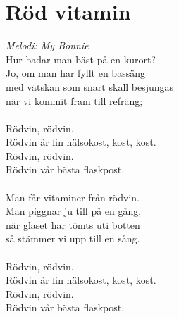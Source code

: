 \section{Röd vitamin}
\textit{Melodi: My Bonnie}
\vspace{2mm}\\
Hur badar man bäst på en kurort?\\
Jo, om man har fyllt en bassäng\\
med vätskan som snart skall besjungas\\
när vi kommit fram till refräng;\\
\\
Rödvin, rödvin.\\
Rödvin är fin hälsokost, kost, kost.\\
Rödvin, rödvin.\\
Rödvin vår bästa flaskpost.\\
\\
Man får vitaminer från rödvin.\\
Man piggnar ju till på en gång,\\
när glaset har tömts uti botten\\
så stämmer vi upp till en sång.\\
\\
Rödvin, rödvin.\\
Rödvin är fin hälsokost, kost, kost.\\
Rödvin, rödvin.\\
Rödvin vår bästa flaskpost.
